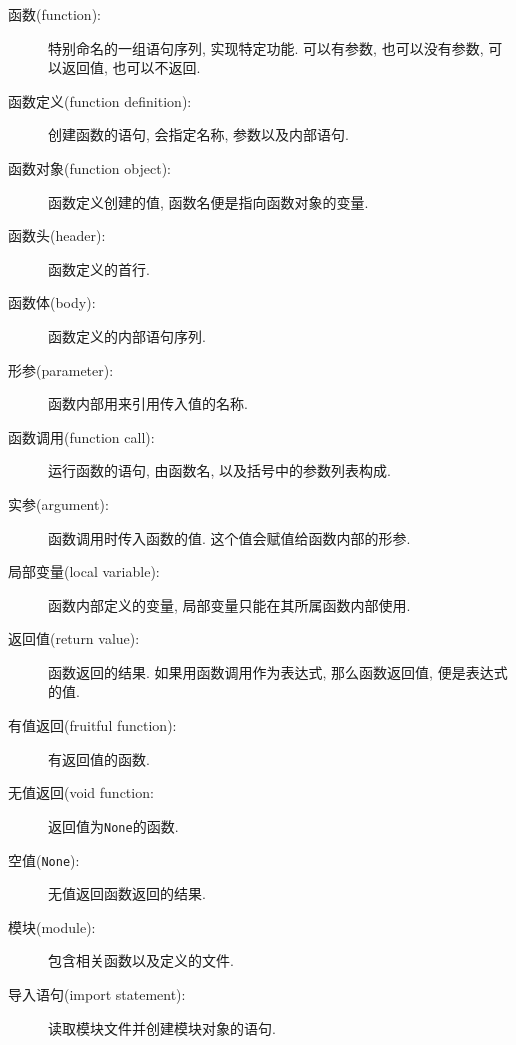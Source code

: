 \documentclass[10pt]{book}
\begin{document}
\begin{description}

\item[函数(function):] 特别命名的一组语句序列, 实现特定功能. 可以有参数, 
也可以没有参数, 可以返回值, 也可以不返回. 

\item[函数定义(function definition):] 创建函数的语句, 会指定名称, 参数以及内部语句. 

\item[函数对象(function object):] 函数定义创建的值, 函数名便是指向函数对象的变量. 

\item[函数头(header):] 函数定义的首行.

\item[函数体(body):] 函数定义的内部语句序列.

\item[形参(parameter):] 函数内部用来引用传入值的名称. 

\item[函数调用(function call):] 运行函数的语句, 由函数名, 以及括号中的参数列表构成. 

\item[实参(argument):] 函数调用时传入函数的值. 这个值会赋值给函数内部的形参. 

\item[局部变量(local variable):] 函数内部定义的变量, 局部变量只能在其所属函数内部使用. 

\item[返回值(return value):] 函数返回的结果. 如果用函数调用作为表达式, 那么函数返回值, 便是表达式的值. 

\item[有值返回(fruitful function):] 有返回值的函数. 

\item[无值返回(void function:] 返回值为{\tt None}的函数. 

\item[空值({\tt None}):] 无值返回函数返回的结果. 

\item[模块(module):] 包含相关函数以及定义的文件. 

\item[导入语句(import statement):] 读取模块文件并创建模块对象的语句. 


\end{description}
\end{document}
